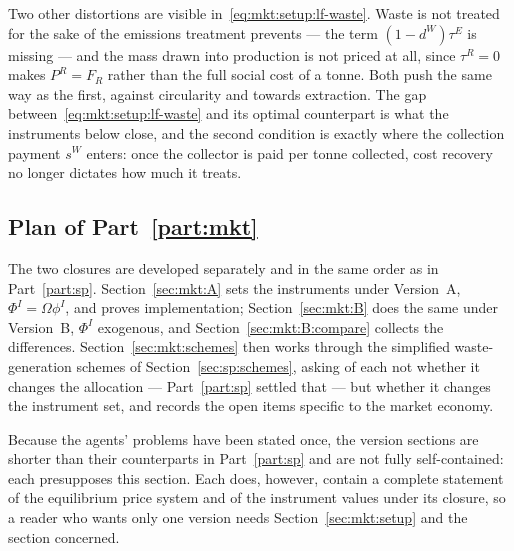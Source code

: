 Two other distortions are visible in~\eqref{eq:mkt:setup:lf-waste}. Waste is not treated for the sake
of the emissions treatment prevents --- the term $\left(1-d^W\right)\tau^E$ is missing --- and the mass
drawn into production is not priced at all, since $\tau^R=0$ makes $P^R=F_R$ rather than the full
social cost of a tonne. Both push the same way as the first, against circularity and towards
extraction. The gap between~\eqref{eq:mkt:setup:lf-waste} and its optimal counterpart is what the
instruments below close, and the second condition is exactly where the collection payment $s^W$ enters:
once the collector is paid per tonne collected, cost recovery no longer dictates how much it treats.


\subsection{Plan of Part~\ref{part:mkt}}\label{sec:mkt:setup:plan}

The two closures are developed separately and in the same order as in Part~\ref{part:sp}.
Section~\ref{sec:mkt:A} sets the instruments under Version~A, $\Phi^I=\Omega\phi^I$, and proves
implementation; Section~\ref{sec:mkt:B} does the same under Version~B, $\Phi^I$ exogenous, and
Section~\ref{sec:mkt:B:compare} collects the differences. Section~\ref{sec:mkt:schemes} then works
through the simplified waste-generation schemes of Section~\ref{sec:sp:schemes}, asking of each not
whether it changes the allocation --- Part~\ref{part:sp} settled that --- but whether it changes the
instrument set, and records the open items specific to the market economy.

Because the agents' problems have been stated once, the version sections are shorter than their
counterparts in Part~\ref{part:sp} and are not fully self-contained: each presupposes this section.
Each does, however, contain a complete statement of the equilibrium price system and of the instrument
values under its closure, so a reader who wants only one version needs Section~\ref{sec:mkt:setup} and
the section concerned.
